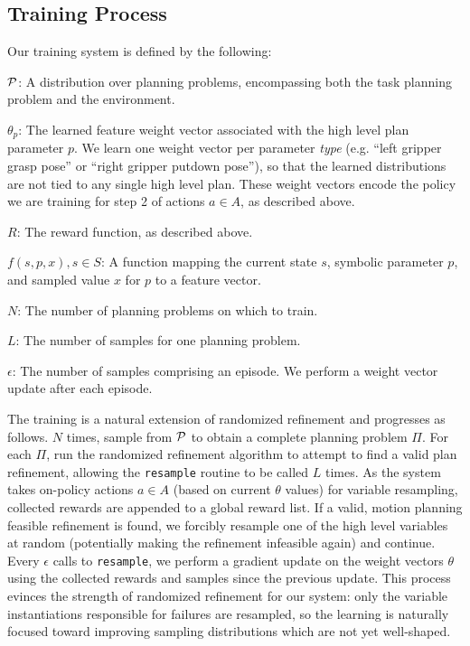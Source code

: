 \subsection{Training Process}
Our training system is defined by the following:
\begin{tightlist}
\item[$\mathcal{P}$:] A distribution over planning problems, encompassing both
the task planning problem and the environment.
\item[$\theta_{p}$:] The learned feature weight vector associated with the high
level plan parameter $p$. We learn one
weight vector per parameter \emph{type} (e.g. ``left gripper grasp pose'' or ``right
gripper putdown pose''), so that the learned distributions are
not tied to any single high level plan. These weight vectors encode the policy
we are training for step 2 of actions $a \in A$, as described above.
\item[$R$:] The reward function, as described above.
\item[$f(s, p, x), s \in S$:] A function mapping the current state $s$, symbolic
parameter $p$, and sampled value $x$ for $p$ to a feature vector.
\item[$N$:] The number of planning problems on which to train.
\item[$L$:] The number of samples for one planning problem.
\item[$\epsilon$:] The number of samples comprising an episode. We perform
a weight vector update after each episode.
\end{tightlist}

The training is a natural extension of randomized
refinement and progresses as follows. $N$ times, sample from $\mathcal{P}$ to obtain
a complete planning problem $\Pi$. For each $\Pi$, run the randomized refinement
algorithm to attempt to find a valid plan refinement, allowing the \texttt{resample}
routine to be called $L$ times. As the system takes on-policy actions $a \in A$ (based on
current $\theta$ values) for variable resampling, collected
rewards are appended to a global reward list. If a valid, motion planning
feasible refinement is found, we forcibly resample one of
the high level variables at random (potentially making the refinement infeasible again)
and continue. Every $\epsilon$ calls to
\texttt{resample}, we perform a gradient update on the weight vectors $\theta$ using the
collected rewards and samples since the previous update. This process
evinces the strength of randomized refinement for our system: only the variable
instantiations responsible for failures are resampled, so the learning is naturally
focused toward improving sampling distributions which are not yet well-shaped.

